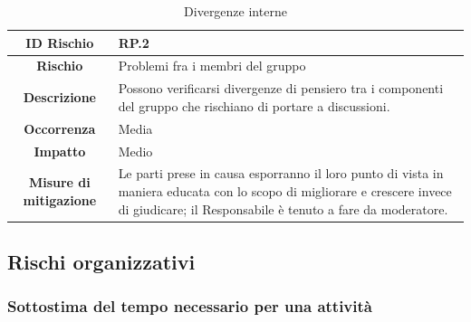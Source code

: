 \documentclass[10pt, a4paper]{article}
\begin{document}
{\renewcommand{\arraystretch}{1.5}
\begin{table}[H]
\begin{tabularx}{\textwidth}{c|X}
\textbf{ID Rischio} & RP.2 \\
\hline
\textbf{Rischio} & Problemi fra i membri del gruppo  \\
\hline
\textbf{Descrizione} & Possono verificarsi divergenze di pensiero tra i componenti del gruppo che rischiano di portare a discussioni. \\
\hline
\textbf{Occorrenza} & Media\\
\hline
\textbf{Impatto} & Medio \\
\hline
\textbf{Misure di mitigazione} & Le parti prese in causa esporranno il loro punto di vista in maniera educata con lo scopo di migliorare e crescere invece di giudicare; il Responsabile è tenuto a fare da moderatore. \\
\end{tabularx}
\caption{Divergenze interne}
\end{table}
}



\subsection{Rischi organizzativi}

\subsubsection{Sottostima del tempo necessario per una attività}
\end{document}
